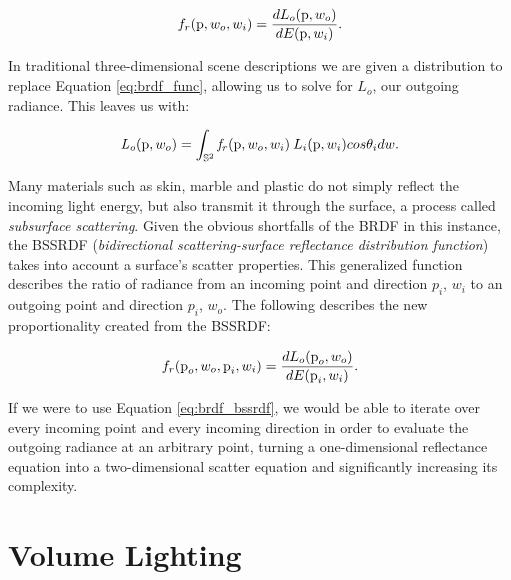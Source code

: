 \documentclass[12pt]{ucthesis}
\begin{document}
\begin{equation}
f_r(\textup{p}, w_o, w_i) =  \frac{dL_o(\textup{p},w_o)}{dE(\textup{p},w_i)}.
\label{eq:brdf_func}
\end{equation}

In traditional three-dimensional scene descriptions we are given a distribution to replace Equation \ref{eq:brdf_func}, allowing us to solve for $L_o$, our outgoing radiance.  This leaves us with:

\begin{equation}
\mathit{L_o}(\textup{p}, w_o) = \int_{\mathbb{S}^2} \mathit{f_r}(\textup{p}, w_o, w_i)\:L_i(\textup{p}, w_i)cos\theta_i dw.
\label{eq:brdf_solve}
\end{equation}


Many materials such as skin, marble and plastic do not simply reflect the incoming light energy, but also transmit it through the surface, a process called \textit{subsurface scattering}.  Given the obvious shortfalls of the BRDF in this instance, the BSSRDF (\textit{bidirectional scattering-surface reflectance distribution function}) takes into account a surface's scatter properties.  This generalized function describes the ratio of radiance from an incoming point and direction $\textit{p}_{i}$, $w_{i}$ to an outgoing point and direction $\textit{p}_{i}$, $w_{o}$.  The following describes the new proportionality created from the BSSRDF:

\begin{equation}
f_r(\textup{p}_o, w_o, \textup{p}_i, w_i) =  \frac{dL_o(\textup{p}_o,w_o)}{dE(\textup{p}_i,w_i)}.
\label{eq:brdf_bssrdf}
\end{equation}

If we were to use Equation \ref{eq:brdf_bssrdf}, we would be able to iterate over every incoming point and every incoming direction in order to evaluate the outgoing radiance at an arbitrary point, turning a one-dimensional reflectance equation into a two-dimensional scatter equation and significantly increasing its complexity.

\section{Volume Lighting}
\end{document}
